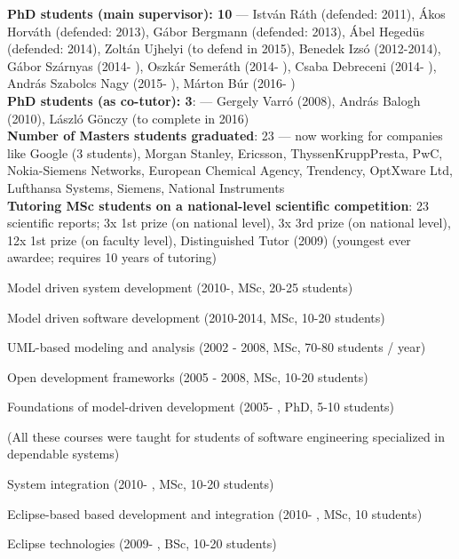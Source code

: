 \documentclass{xetexCV}
\begin{document}
\textbf{PhD students (main supervisor): 10} --- Istv\'an R\'ath (defended: 2011), \'Akos Horv\'ath (defended: 2013), G\'abor
Bergmann (defended: 2013), \'Abel Heged\"us (defended: 2014), Zolt\'an Ujhelyi (to defend in 2015), 
Benedek Izs\'o (2012-2014), 
G\'abor Sz\'arnyas (2014- ), Oszk\'ar Semer\'ath (2014- ), Csaba Debreceni (2014- ), Andr\'as Szabolcs Nagy (2015- ), M\'arton B\'ur (2016- )\\

\textbf{PhD students (as co-tutor): 3}: --- Gergely Varr\'o (2008), Andr\'as Balogh (2010), L\'aszl\'o G\"onczy (to complete in 2016) \\

\textbf{Number of Masters students graduated}: 23 --- now working for companies like
Google (3 students), Morgan Stanley, Ericsson, ThyssenKruppPresta, PwC, Nokia-Siemens Networks, European Chemical Agency, Trendency, OptXware Ltd, Lufthansa Systems, Siemens, National Instruments \\

\textbf{Tutoring MSc students on a national-level scientific competition}: 23
scientific reports; 3x 1st prize (on national level), 3x 3rd prize (on national
level), 12x 1st prize (on faculty level), %
Distinguished Tutor (2009) (youngest ever awardee; requires 10 years of
tutoring) \\


Model driven system development (2010-, MSc, 20-25 students)

Model driven software development (2010-2014, MSc, 10-20 students)

UML-based modeling and analysis (2002 - 2008, MSc, 70-80 students / year)

Open development frameworks (2005 - 2008, MSc, 10-20 students)

Foundations of model-driven development (2005- , PhD, 5-10 students)

(All these courses were taught for students of software engineering specialized in dependable systems)


System integration (2010- , MSc, 10-20 students)

Eclipse-based based development and integration (2010- , MSc, 10 students) 

Eclipse technologies (2009- , BSc, 10-20 students) 
\end{document}
